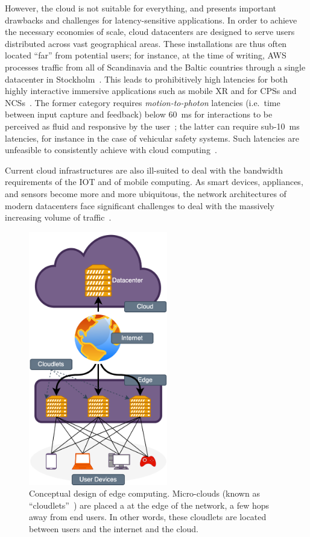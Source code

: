 However, the cloud is not suitable for everything, and presents important drawbacks and challenges for latency-sensitive applications.
In order to achieve the necessary economies of scale, cloud datacenters are designed to serve users distributed across vast geographical areas.
These installations are thus often located ``far'' from potential users;
for instance, at the time of writing, \gls{AWS} processes traffic from all of Scandinavia and the Baltic countries through a single datacenter in Stockholm~\cite{awsregions}.
This leads to prohibitively high latencies for both highly interactive immersive applications such as mobile \gls{XR} and for \glspl{CPS} and \glspl{NCS}~\cite{satyanarayanan2009case,varghese2016challenges,shi2016promise}.
The former category requires \emph{motion-to-photon} latencies (i.e.\ time between input capture and feedback) below \SI{60}{\milli\second} for interactions to be perceived as fluid and responsive by the user~\cite{chen2017empirical}; the latter can require sub-\SI{10}{\milli\second} latencies, for instance in the case of vehicular safety systems.
Such latencies are unfeasible to consistently achieve with cloud computing~\cite{dang2021cloudy}.

Current cloud infrastructures are also ill-suited to deal with the bandwidth requirements of the \gls{IOT} and of mobile computing.
As smart devices, appliances, and sensors become more and more ubiquitous, the network architectures of modern datacenters face significant challenges to deal with the massively increasing volume of traffic~\cite{shi2016edge,wang2019towards}.

\begin{figure}
    \centering
    \includegraphics[height=30em]{Figs/edgecomputing}
    \caption{%
        Conceptual design of edge computing.
        Micro-clouds (known as ``cloudlets''~\cite{satyanarayanan2009case}) are placed a at the edge of the network, a few hops away from end users.
        In other words, these cloudlets are located between users and the internet and the cloud.
    }\label{fig:edgecomputing}
\end{figure}

